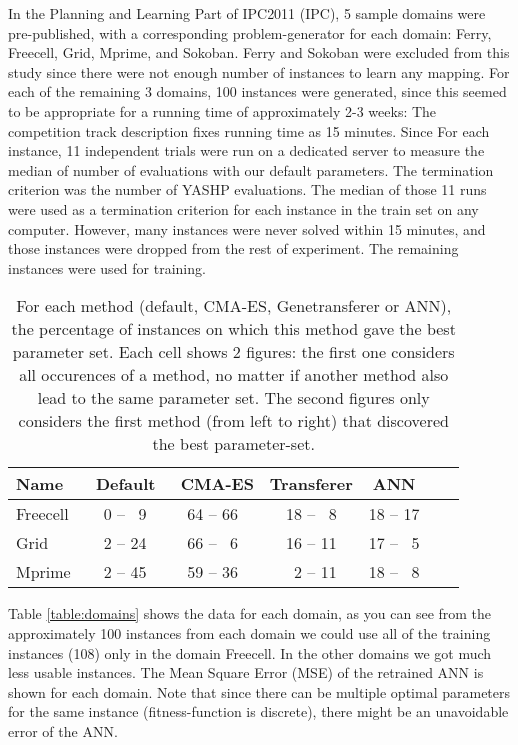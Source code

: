 \documentclass{MYsig-alternate}
\begin{document}
In the Planning and Learning Part of IPC2011 (IPC), 5 sample domains were pre-published, with a corresponding problem-generator for each domain: Ferry, Freecell, Grid, Mprime, and Sokoban. Ferry and Sokoban were excluded from this study since there were not enough number of instances to learn any mapping. For each of the remaining 3 domains, 100 instances were generated, since this seemed to be appropriate for a running time of approximately 2-3 weeks: The competition track description fixes running time as 15 minutes. Since For each instance, 11 independent trials were run on a dedicated server to measure the median of number of evaluations with our default parameters. The termination criterion was the number of YASHP evaluations. The median of those 11 runs were used as a termination criterion for each instance in the train set on any computer. However, many instances were never solved within 15 minutes, and those instances were dropped from the rest of experiment. The remaining instances were used for training.


 \begin{table}[tb!]
\centering
\begin{tabular}{l c c c c c c}
\hline\hline
Name & \ Default & \ CMA-ES &  Transferer & ANN \\ 
\hline
Freecell & ~0 -- ~9& 64 -- 66  & 18 -- ~8  & 18 -- 17     \\
Grid & ~2 -- 24 & 66 -- ~6  & 16 -- 11 & 17 -- ~5  &    \\
Mprime &  ~2 -- 45& 59 -- 36 & ~2 -- 11  & 18 -- ~8  &    \\
\hline
\end{tabular}
\caption{For each method (default, CMA-ES, Genetransferer or ANN), the percentage of instances on which this method gave the best parameter set. Each cell shows 2 figures: the first one considers all occurences of a method, no matter if another method also lead to the same parameter set. The second figures only considers the first method (from left to right) that discovered the best parameter-set.}
\label{table:hints}
\end{table} 


Table \ref{table:domains} shows the data for each domain, as you can see from the approximately 100 instances from each domain we could use all of the training instances (108) only in the domain Freecell. In the other domains we got much less usable instances. The Mean Square Error (MSE) of the retrained ANN is shown for each domain. Note that since there can be multiple optimal parameters for the same instance (fitness-function is discrete), there might be an unavoidable error of the ANN.
\end{document}
